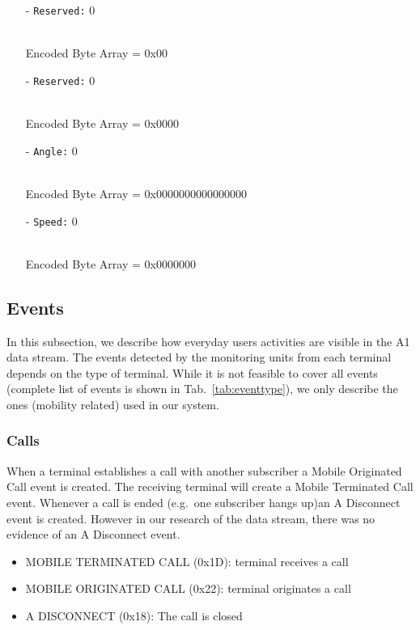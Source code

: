\documentclass[master,english]{hgbthesis}
\begin{document}
\begin{itemize}
	\item[-] \verb|Reserved:| 0

	      \\Encoded Byte Array = 0x00

	\item[-] \verb|Reserved:| 0

	      \\Encoded Byte Array = 0x0000

	\item[-] \verb|Angle:| 0

	      \\Encoded Byte Array = 0x0000000000000000

	\item[-] \verb|Speed:| 0

	      \\Encoded Byte Array = 0x0000000

\end{itemize}

\subsection{Events}

\label{subsec:events}

In this subsection, we describe how everyday users activities are visible in the A1 data stream. The events detected by the monitoring units from each terminal depends on the type of terminal. While it is not feasible to cover all events (complete list of events is shown in Tab.~\ref{tab:eventtype}), we only describe the ones (mobility related) used in our system. 

\subsubsection{Calls}

When a terminal establishes a call with another subscriber a Mobile Originated Call event is created. The receiving terminal will create a Mobile Terminated Call event. Whenever a call is ended (e.g.\ one subscriber hangs up)an A Disconnect event is created. However in our research of the data stream, there was no evidence of an A Disconnect event.

\begin{itemize}

	\item MOBILE TERMINATED CALL (0x1D): terminal receives a call

	\item MOBILE ORIGINATED CALL (0x22): terminal originates a call

	\item A DISCONNECT (0x18): The call is closed

\end{itemize}
\end{document}
